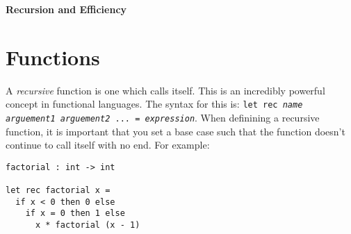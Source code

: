 \documentclass[12pt]{article}
\begin{document}
\begin{center}\LARGE\bf
    Recursion and Efficiency
\end{center}

\section{Functions}
A \textit{recursive} function is one which calls itself. This is an incredibly powerful concept in
functional languages. The syntax for this is: \texttt{let rec \textit{name arguement1 arguement2} ... = \textit{expression}}.
When definining a recursive function, it is important that you set a base case such that the function
doesn't continue to call itself with no end. For example:
\begin{lstlisting}
factorial : int -> int

let rec factorial x =
  if x < 0 then 0 else
    if x = 0 then 1 else
      x * factorial (x - 1)
\end{lstlisting}
\end{document}

